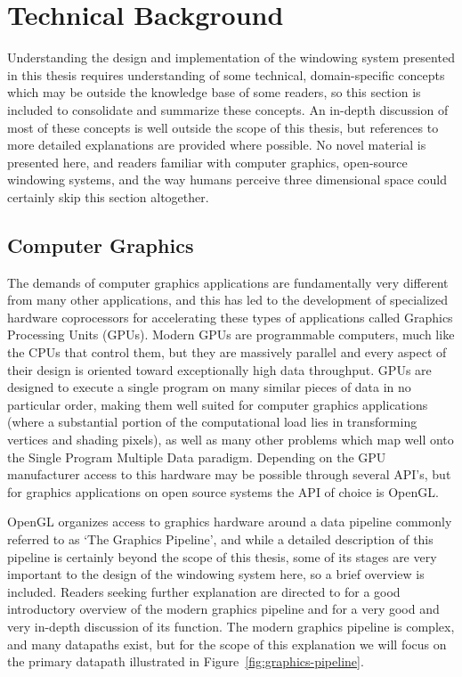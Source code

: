 \chapter{Technical Background}
\label{sec:tech-background}
Understanding the design and implementation of the windowing system presented in this thesis requires understanding of some technical, domain-specific concepts which may be outside the knowledge base of some readers, so this section is included to consolidate and summarize these concepts. An in-depth discussion of most of these concepts is well outside the scope of this thesis, but references to more detailed explanations are provided where possible. No novel material is presented here, and readers familiar with computer graphics, open-source windowing systems, and the way humans perceive three dimensional space could certainly skip this section altogether.

\section{Computer Graphics}
\label{sec:graphics-pipeline}
The demands of computer graphics applications are fundamentally very different from many other applications, and this has led to the development of specialized hardware coprocessors for accelerating these types of applications called Graphics Processing Units (GPUs). Modern GPUs are programmable computers, much like the CPUs that control them, but they are massively parallel and every aspect of their design is oriented toward exceptionally high data throughput. GPUs are designed to execute a single program on many similar pieces of data in no particular order, making them well suited for computer graphics applications (where a substantial portion of the computational load lies in transforming vertices and shading pixels), as well as many other problems which map well onto the Single Program Multiple Data paradigm. Depending on the GPU manufacturer access to this hardware may be possible through several API’s, but for graphics applications on open source systems the API of choice is OpenGL.
		
OpenGL organizes access to graphics hardware around a data pipeline commonly referred to as ‘The Graphics Pipeline’, and while a detailed description of this pipeline is certainly beyond the scope of this thesis, some of its stages are very important to the design of the windowing system here, so a brief overview is included. Readers seeking further explanation are directed to \cite{graphics-intro} for a good introductory overview of the modern graphics pipeline and \cite{trip-through-pipeline} for a very good and very in-depth discussion of its function. The modern graphics pipeline is complex, and many datapaths exist, but for the scope of this explanation we will focus on the primary datapath illustrated in Figure~\ref{fig:graphics-pipeline}.

